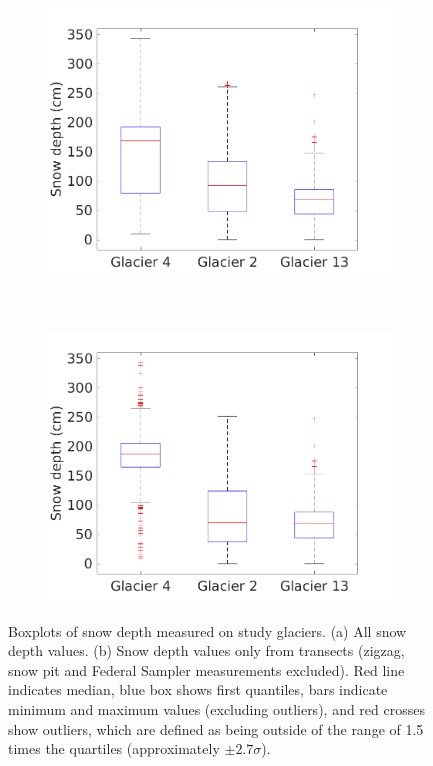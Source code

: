 \documentclass{sfuthesis}
\begin{document}
\begin{figure}[H]
    \centering
    \begin{subfigure}[b]{0.48\textwidth}
        \includegraphics[width=\textwidth]{box_depth_wZZ.png}
        \caption{ }
        \label{fig:box_depth_wZZ}
    \end{subfigure}
    ~
    \begin{subfigure}[b]{0.48\textwidth}
        \includegraphics[width=\textwidth]{box_depth_noZZ.png}
        \caption{}
        \label{fig:box_depth_noZZ}
    \end{subfigure}

    \caption{Boxplots of snow depth measured on study glaciers. (a) All snow depth values. (b) Snow depth values only from transects (zigzag, snow pit and Federal Sampler measurements excluded). Red line indicates median, blue box shows first quantiles, bars indicate minimum and maximum values (excluding outliers), and red crosses show outliers, which are defined as being outside of the range of 1.5 times the quartiles (approximately $\pm2.7\sigma$).}
    \label{fig:box_depth_transects}
\end{figure}
\end{document}
